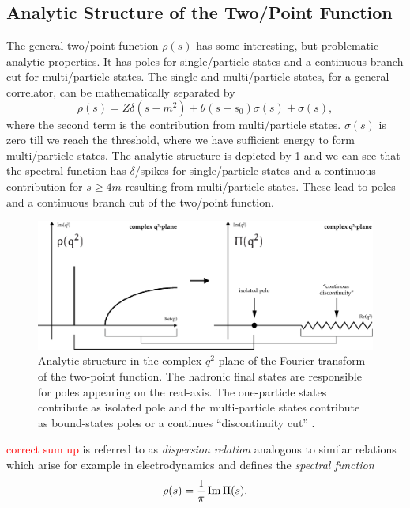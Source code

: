 \documentclass[../../index.tex]{subfiles}
\begin{document}
\subsection{Analytic Structure of the Two\-/Point Function}
The general two\-/point function $\rho(s)$ has some interesting, but problematic
analytic properties. It has poles for single\-/particle states and a continuous
branch cut for multi\-/particle states. The single and multi\-/particle states,
for a general correlator, can be mathematically separated by
\begin{equation}
  \rho(s) = Z \delta(s-m^2) + \theta(s-s_0)\sigma(s)
  + \sigma(s),
\end{equation}
where the second term is the contribution from multi\-/particle states.
\(\sigma(s)\) is zero till we reach the threshold, where we have sufficient
energy to form multi\-/particle states. The analytic structure is depicted by
\cref{fig:analyticStructureCorrelator} and we can see that the spectral function
has \(\delta\)\-/spikes for single\-/particle states and a continuous
contribution for \(s\geq 4m\) resulting from multi\-/particle states. These lead
to poles and a continuous branch cut of the two\-/point function.
\begin{figure}
  \centering
  \includegraphics[width=\textwidth]{./images/analyticStructureCorrelator.eps}
  \caption{Analytic structure in the complex $q^2$-plane of the Fourier
    transform of the two-point function. The hadronic final states are
    responsible for poles appearing on the real-axis. The one-particle states
    contribute as isolated pole and the multi-particle states contribute as
    bound-states poles or a continues ``discontinuity cut''
    \cite{Peskin1995,Zwicky2016}.}
  \label{fig:analyticStructureCorrelator}
\end{figure}


\textcolor{red}{correct sum up} is referred to as \textit{dispersion relation}
analogous to similar relations which arise for example in electrodynamics and
defines the \textit{spectral function}
\begin{equation}
  \label{eq:spectralFunction}
  \rho(s) = \frac{1}{\pi} \operatorname{Im} \Pi(s).
\end{equation}
\end{document}
